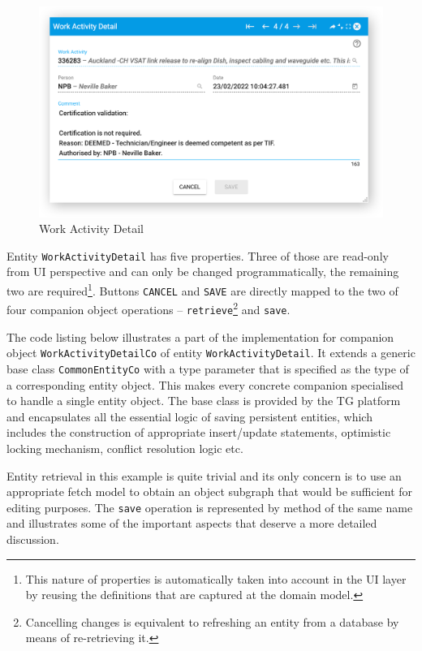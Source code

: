 \documentclass[a4paper,12pt,oneside,openright,final]{memoir} %
\begin{document}
	\begin{figure}[!h]
  		\centering
        \includegraphics[width=.55\textwidth]{images/06-wa-detail-master.png}  
        \caption{Work Activity Detail}
        \label{fig:wa-detail}
  	\end{figure}

	Entity \texttt{WorkActivityDetail} has five properties.
	Three of those are read-only from UI perspective and can only be changed programmatically, the remaining two are required\footnote{This nature of properties is automatically taken into account in the UI layer by reusing the definitions that are captured at the domain model.}.
	Buttons \texttt{CANCEL} and \texttt{SAVE} are directly mapped to the two of four companion object operations -- \texttt{retrieve}\footnote{Cancelling changes is equivalent to refreshing an entity from a database by means of re-retrieving it.} and \texttt{save}.

	The code listing below illustrates a part of the implementation for companion object \texttt{Work\-Activity\-DetailCo} of entity \texttt{WorkActivityDetail}.
	It extends a generic base class \texttt{CommonEntityCo} with a type parameter that is specified as the type of a corresponding entity object.
	This makes every concrete companion specialised to handle a single entity object.
	The base class is provided by the TG platform and encapsulates all the essential logic of saving persistent entities, which includes the construction of appropriate insert/update statements, optimistic locking mechanism, conflict resolution logic etc.

	Entity retrieval in this example is quite trivial and its only concern is to use an appropriate fetch model to obtain an object subgraph that would be sufficient for editing purposes.
	The \texttt{save} operation is represented by method of the same name and illustrates some of the important aspects that deserve a more detailed discussion.
	
	\medskip
	
\end{document}
